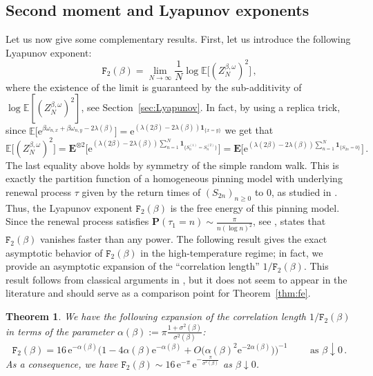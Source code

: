 \documentclass[11pt]{amsart}
\numberwithin{equation}{section}
\newcommand*{\EE}{\mathbb{E}}
\newcommand*{\bE}{\mathbf{E}}
\newcommand*{\bP}{\mathbf{P}}
\newcommand*{\ind}{\mathbf{1}}
\newcommand{\e}{\mathrm{e}}
\newcommand*{\tF}{\mathtt{F}}
\theoremstyle{plain}
\newtheorem{theorem}{Theorem}[section]
\theoremstyle{definition}
\theoremstyle{remark}
\begin{document}
\subsection{Second moment and Lyapunov exponents}


Let us now give some complementary results. 
First, let us introduce the following Lyapunov exponent:
\[
\tF_2(\beta) = \lim_{N\to\infty} \frac{1}{N} \log \EE\big[(Z_N^{\beta,\omega})^2 \big] \,,
\]
where the existence of the limit is guaranteed by the sub-additivity of \(\log \EE[(Z_N^{\beta,\omega})^2]\), see Section~\ref{sec:Lyapunov}.
In fact, by using a replica trick, since \(\EE\big[\e^{\beta \omega_{n,x} + \beta \omega_{n,y} -2\lambda(\beta)}\big] = \e^{(\lambda(2\beta)-2\lambda(\beta)) \ind_{\{x=y\}}}\) we get that
\[
\EE\big[ (Z_N^{\beta,\omega})^2\big] = \bE^{\otimes 2} \Big[ \e^{ (\lambda(2\beta)-2\lambda(\beta)) \sum_{n=1}^N \ind_{\{S_{n}^{(1)} =S_n^{(2)}\}} }\Big] = \bE \Big[ \e^{ (\lambda(2\beta)-2\lambda(\beta)) \sum_{n=1}^N \ind_{\{S_{2n}=0\}}}\Big] \,.
\]
The last equality above holds by symmetry of the simple random walk.
This is exactly the partition function of a homogeneous pinning model with underlying renewal process \(\tau\) given by the return times of \((S_{2n})_{n\geq 0}\) to \(0\), as studied in \cite[Chap.~2]{Gia07}.
Thus, the Lyapunov exponent \(\tF_2(\beta)\) is the free energy of this pinning model.
Since the renewal process satisfies \(\bP(\tau_1=n) \sim \frac{\pi}{n (\log n)^2}\), see \cite{JP72}, \cite[Theorem~2.1]{Gia07} states that \(\tF_2(\beta)\) vanishes faster than any power.
The following result gives the exact asymptotic behavior of \(\tF_2(\beta)\) in the high-temperature regime; in fact, we provide an asymptotic expansion of the ``correlation length'' \(1/\tF_2(\beta)\). This result follows from classical arguments in \cite[Chap.~2]{Gia07}, but it does not seem to appear in the literature and should serve as a comparison point for Theorem~\ref{thm:fe}.


\begin{theorem}
       \label{thm:second-moment}
       We have the following expansion of the correlation length \(1/\tF_2(\beta)\) in terms of the parameter \(\alpha(\beta) := \pi \frac{1+\sigma^2(\beta)}{\sigma^2(\beta)}\):
       \begin{equation*}
              {\tF_2(\beta)} = {16}\, \e^{-\alpha(\beta)} \Big(1 - 4 \alpha(\beta) \e^{-\alpha(\beta)} + O\big( \alpha(\beta)^2 \e^{-2\alpha(\beta)} \big) \Big)^{-1} \qquad \text{ as } \beta \downarrow 0\,.
       \end{equation*}
       As a consequence, we have \(\tF_2(\beta)  \sim 16\, \e^{-\pi}\, \e^{-\frac{\pi}{\sigma^{2}(\beta)}}\) as \(\beta \downarrow 0\).
\end{theorem}
\end{document}
